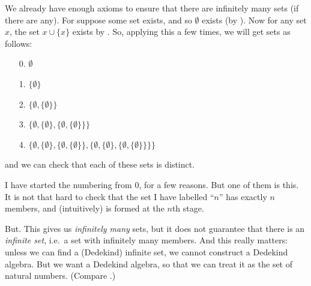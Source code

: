 \documentclass[../../../include/open-logic-section]{subfiles}
\begin{document}
We already have enough axioms to ensure that there are infinitely many sets (if there are any). For suppose some set exists, and so $\emptyset$ exists (by ). Now for any set $x$, the set $x \cup \{x\}$ exists by . So, applying this a few times, we will get sets as follows:
\begin{enumerate}
	\item[0.] $\emptyset$ %
	\item[1.] $ \{\emptyset\}$ %
	\item[2.] $\{\emptyset, \{\emptyset\}\}$ %
	\item[3.] $\{\emptyset, \{\emptyset\}, \{\emptyset, \{\emptyset\}\}\}$ %
	\item[4.] $\{\emptyset, \{\emptyset\}, \{\emptyset, \{\emptyset\}\}, \{\emptyset, \{\emptyset\}, \{\emptyset, \{\emptyset\}\}\}\}$%
\end{enumerate}
and we can check that each of these sets is distinct. 

I have started the numbering from $0$, for a few reasons. But one of them is this. It is not that hard to check that the set I have labelled ``$n$'' has exactly $n$ members, and (intuitively) is formed at the $n$th stage. 

But. This gives us \emph{infinitely many} sets, but it does not guarantee that there is an \emph{infinite set}, i.e.\ a set with infinitely many members. And this really matters: unless we can find a (Dedekind) infinite set, we cannot construct a Dedekind algebra. But we want a Dedekind algebra, so that we can treat it as the set of natural numbers. (Compare .)
\end{document}
